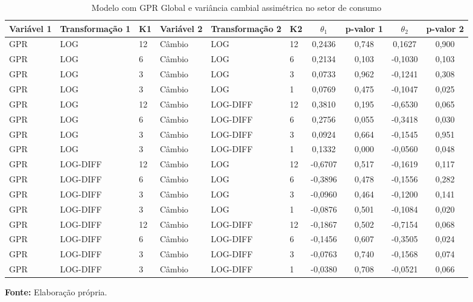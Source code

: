 \begin{table}[H]
\centering
\caption{Modelo com GPR Global e variância cambial assimétrica no setor de consumo}
\label{tab:modelo-gpr-cambio-consumo}
\scriptsize
\begin{adjustbox}{max width=\textwidth}
\begin{tabular}{@{}llllllcccc@{}}
\toprule
Variável 1 & Transformação 1 & K1 & Variável 2 & Transformação 2 & K2 & $\theta_1$ & p-valor 1 & $\theta_2$ & p-valor 2 \\
\midrule
GPR & LOG & 12 & Câmbio & LOG & 12 & 0,2436 & 0,748 & 0,1627 & 0,900 \\
GPR & LOG & 6 & Câmbio & LOG & 6 & 0,2134 & 0,103 & -0,1030 & 0,103 \\
GPR & LOG & 3 & Câmbio & LOG & 3 & 0,0733 & 0,962 & -0,1241 & 0,308 \\
GPR & LOG & 3 & Câmbio & LOG & 1 & 0,0769 & 0,475 & -0,1047 & 0,025 \\
GPR & LOG & 12 & Câmbio & LOG-DIFF & 12 & 0,3810 & 0,195 & -0,6530 & 0,065 \\
GPR & LOG & 6 & Câmbio & LOG-DIFF & 6 & 0,2756 & 0,055 & -0,3418 & 0,030 \\
GPR & LOG & 3 & Câmbio & LOG-DIFF & 3 & 0,0924 & 0,664 & -0,1545 & 0,951 \\
GPR & LOG & 3 & Câmbio & LOG-DIFF & 1 & 0,1332 & 0,000 & -0,0560 & 0,048 \\
GPR & LOG-DIFF & 12 & Câmbio & LOG & 12 & -0,6707 & 0,517 & -0,1619 & 0,117 \\
GPR & LOG-DIFF & 6 & Câmbio & LOG & 6 & -0,3896 & 0,478 & -0,1556 & 0,282 \\
GPR & LOG-DIFF & 3 & Câmbio & LOG & 3 & -0,0960 & 0,464 & -0,1200 & 0,141 \\
GPR & LOG-DIFF & 3 & Câmbio & LOG & 1 & -0,0876 & 0,501 & -0,1084 & 0,020 \\
GPR & LOG-DIFF & 12 & Câmbio & LOG-DIFF & 12 & -0,1867 & 0,502 & -0,7154 & 0,068 \\
GPR & LOG-DIFF & 6 & Câmbio & LOG-DIFF & 6 & -0,1456 & 0,607 & -0,3505 & 0,024 \\
GPR & LOG-DIFF & 3 & Câmbio & LOG-DIFF & 3 & -0,0763 & 0,740 & -0,1568 & 0,074 \\
GPR & LOG-DIFF & 3 & Câmbio & LOG-DIFF & 1 & -0,0380 & 0,708 & -0,0521 & 0,066 \\
\bottomrule
\end{tabular}
\end{adjustbox}
\vspace{1mm}
\begin{minipage}{\textwidth}
\footnotesize
\textbf{Fonte:} Elaboração própria.
\end{minipage}
\end{table}

